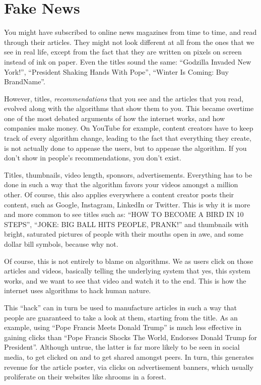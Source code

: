 \section{Fake News}

You might have subscribed to online news magazines from time to time, and read through their articles. They might not look different at all from the ones that we see in real life, except from the fact that they are written on pixels on screen instead of ink on paper. Even the titles sound the same: ``Godzilla Invaded New York!'', ``President Shaking Hands With Pope'', ``Winter Is Coming: Buy BrandName''.

However, titles, \textit{recommendations} that you see and the articles that you read, evolved along with the algorithms that show them to you. This became overtime one of the most debated arguments of how the internet works, and how companies make money. On YouTube for example, content creators have to keep track of every algorithm change, leading to the fact that everything they create, is not actually done to appease the users, but to appease the algorithm. If you don't show in people's recommendations, you don't exist.

Titles, thumbnails, video length, sponsors, advertisements. Everything has to be done in such a way that the algorithm favors your videos amongst a million other. Of course, this also applies everywhere a content creator posts their content, such as Google, Instagram, LinkedIn or Twitter. This is why it is more and more common to see titles such as: ``HOW TO BECOME A BIRD IN 10 STEPS'', ``JOKE: BIG BALL HITS PEOPLE, PRANK!'' and thumbnails with bright, saturated pictures of people with their mouths open in awe, and some dollar bill symbols, because why not.

Of course, this is not entirely to blame on algorithms. We as users click on those articles and videos, basically telling the underlying system that yes, this system works, and we want to see that video and watch it to the end. This is how the internet uses algorithms to hack human nature.

This ``hack'' can in turn be used to manufacture articles in such a way that people are guaranteed to take a look at them, starting from the title. As an example, using ``Pope Francis Meets Donald Trump'' is much less effective in gaining clicks than ``Pope Francis Shocks The World, Endorses Donald Trump for President''. Although untrue, the latter is far more likely to be seen in social media, to get clicked on and to get shared amongst peers. In turn, this generates revenue for the article poster, via clicks on advertisement banners, which usually proliferate on their websites like shrooms in a forest.

